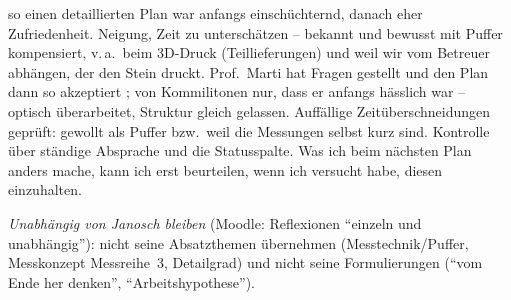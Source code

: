 \begin{hinweise}
\begin{enumerate}
      so einen detaillierten Plan war anfangs einschüchternd, danach eher Zufriedenheit. Neigung, Zeit
      zu unterschätzen -- bekannt und bewusst mit Puffer kompensiert, v.\,a.\ beim 3D-Druck (Teillieferungen)
      und weil wir vom Betreuer abhängen, der den Stein druckt. Prof.\ Marti hat Fragen gestellt und den Plan
      dann so akzeptiert \cite{Marti2026Gespraech}; von Kommilitonen nur, dass er anfangs hässlich war --
      optisch überarbeitet, Struktur gleich gelassen. Auffällige Zeitüberschneidungen geprüft: gewollt als
      Puffer bzw.\ weil die Messungen selbst kurz sind. Kontrolle über ständige Absprache und die
      Statusspalte. Was ich beim nächsten Plan anders mache, kann ich erst beurteilen, wenn ich versucht
      habe, diesen einzuhalten.
\end{enumerate}
\emph{Unabhängig von Janosch bleiben} (Moodle: Reflexionen \enquote{einzeln und unabhängig}): nicht seine
Absatzthemen übernehmen (Messtechnik/Puffer, Messkonzept Messreihe~3, Detailgrad) und nicht seine
Formulierungen (\enquote{vom Ende her denken}, \enquote{Arbeitshypothese}).
\end{hinweise}
